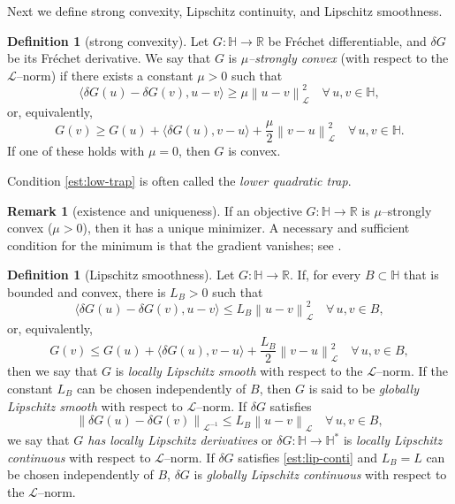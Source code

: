 \documentclass{amsart}
\newcommand{\dG}{{\delta G}}
\newcommand{\LL}{\mathcal{L}}
\newcommand{\LLinv}{{\mathcal{L}^{-1}}}
\newcommand{\norm}[2]{\left\| #1 \right\| _{#2}}
\newcommand{\pairing}[2]{\bigl\langle #1 , #2 \bigr\rangle}
\newcommand{\HH}{\mathbb{H}}
\newcommand{\RR}{\mathbb{R}}
\theoremstyle{definition}
\newtheorem{defn}[thm]{Definition}
\newtheorem{rmk}[thm]{Remark}
\begin{document}
Next we define strong convexity, Lipschitz continuity, and Lipschitz smoothness.

\begin{defn}[strong convexity]
	Let $G:\HH\to\RR$ be Fr\'echet differentiable, and $\delta G$ be its Fr\'echet derivative. We say that $G$ is \emph{$\mu$--strongly convex} (with respect to the $\LL$--norm) if there exists a constant $\mu>0$ such that
	\begin{equation}
		\pairing{\dG(u)-\dG(v)}{u-v}\ge \mu	 \norm{u-v}{\LL}^2 \quad \forall \, u,v\in\HH ,
		\label{est:strconv-pair}
	\end{equation}
	or, equivalently,
	\begin{equation}
		G(v)\ge G(u) + \pairing{\dG(u)}{v-u} +\frac{\mu}{2} \norm{v-u}{\LL}^2 \quad \forall \, u,v\in\HH .	
		\label{est:low-trap}
	\end{equation}
	If one of these holds with $\mu=0$, then $G$ is convex.
\end{defn}

Condition \eqref{est:low-trap} is often called the \emph{lower quadratic trap}. 

	\begin{rmk}[existence and uniqueness]
If an objective $G:\HH\to\RR$ is $\mu$--strongly convex ($\mu>0$), then it has a unique minimizer. A necessary and sufficient condition for the minimum is that the gradient vanishes; see \cite{nesterov2004intro, nesterov2018lectures, ciarlet1989intro}.
	\end{rmk}	

\begin{defn}[Lipschitz smoothness]\label{def:norm-loc-lip}
    Let $G:\HH\to\RR$. If, for every $B\subset \HH$ that is bounded and convex, there is $L_B>0$ such that
	\begin{equation}
		\pairing{\dG(u)-\dG(v)}{u-v} \le L_B\norm{u-v}{\LL}^2 \quad \forall \, u,v\in B,
		\label{est:lip-pair}
	\end{equation}
	or, equivalently,
	\begin{equation}
		G(v)\le G(u) + \pairing{\dG(u)}{v-u} +\frac{L_B}{2} \norm{v-u}{\LL}^2 \quad \forall \, u,v\in B,
		\label{est:up-trap}
	\end{equation}
	then we say that $G$ is \emph{locally Lipschitz smooth} with respect to the $\LL$--norm. If the constant $L_B$ can be chosen independently of $B$, then $G$ is said to be \emph{globally Lipschitz smooth} with respect to $\LL$--norm.
	If $\dG$ satisfies 
	\begin{equation}
		\norm{\dG(u)-\dG(v)}{\LLinv} \le L_B\norm{u-v}{\LL} \quad \forall \, u,v\in B,
		\label{est:lip-conti}
	\end{equation}
	we say that \emph{$G$ has locally Lipschitz derivatives} or $\dG:\HH\to\HH^*$ is \emph{locally Lipschitz continuous} with respect to $\LL$--norm. If $\dG$ satisfies \eqref{est:lip-conti} and $L_B=L$ can be chosen independently of $B$, $\dG$ is \emph{globally Lipschitz continuous} with respect to the $\LL$--norm.
\end{defn}
\end{document}
